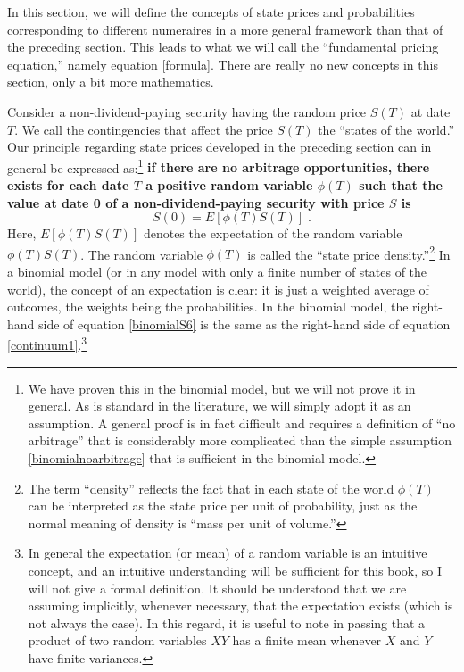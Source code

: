 In this section, we will define the concepts of state prices and probabilities corresponding to different numeraires in a more general framework than that of the preceding section.  This leads to what we will call the ``fundamental pricing equation,'' namely equation \eqref{formula}.  There are really no new concepts in this section, only a bit more mathematics.

Consider a non-dividend-paying security having the random price $S(T)$ at date $T$.  We call the contingencies that affect the price $S(T)$ the ``states of the world.''  Our principle regarding state prices developed in the preceding section can in general be expressed as:\footnote{We have proven this in the binomial model, but we will not prove it in general.  As is standard in the literature, we will simply adopt it as an assumption.  A general proof is in fact difficult and requires a definition of ``no arbitrage'' that is considerably more complicated than the simple assumption \eqref{binomialnoarbitrage} that is sufficient in the binomial model.} \textbf{if there are no arbitrage opportunities, there exists for each date $T$ a positive random variable $\phi(T)$ such that the value at date 0 of a non-dividend-paying security with price $S$ is }
\begin{equation}\label{continuum1}
S(0) = E[\phi(T)S(T)]\;.
\end{equation}
Here, $E[\phi(T)S(T)]$ denotes the expectation of the random variable $\phi(T)S(T)$.  The random variable $\phi(T)$ is  called the ``state price density.''\footnote{The term ``density'' reflects the fact that in each state of the world $\phi(T)$ can be interpreted as the state price per unit of probability, just as the normal meaning of density is ``mass per unit of volume.''}  In a binomial model (or in any model with only a finite number of states of the world), the concept of an expectation is clear: it is just a weighted average of outcomes, the weights being the probabilities.  In the binomial model, the right-hand side of equation \eqref{binomialS6} is the same as the right-hand side of equation \eqref{continuum1}.\footnote{
In general the expectation (or mean) of a random variable is an intuitive concept, and an intuitive understanding will be sufficient for this book, so I will not give a formal definition.  It should be understood that we are assuming implicitly, whenever necessary, that the expectation exists (which is not always the case).  In this regard, it is useful to note in passing that a product of two random variables $XY$ has a finite mean whenever $X$ and $Y$ have finite variances.}  



